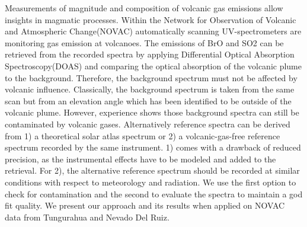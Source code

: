 

Measurements of magnitude and composition of volcanic gas emissions allow insights in magmatic processes. Within the Network for Observation of Volcanic and Atmospheric Change(NOVAC) automatically scanning UV-spectrometers are monitoring gas emission at  volcanoes. The emissions of BrO and SO2 can be retrieved from the recorded spectra by applying Differential Optical Absorption Spectroscopy(DOAS) and comparing the optical absorption of the volcanic plume to the background. Therefore, the background spectrum must not be affected by volcanic influence. Classically, the background spectrum is taken from the same scan but from an elevation angle which has been identified to be outside of the volcanic plume. However, experience shows those background spectra can still be contaminated by volcanic gases.  Alternatively reference spectra can be derived from 1) a theoretical solar atlas spectrum or 2) a volcanic-gas-free reference spectrum recorded by the same instrument. 1) comes with a drawback of reduced precision, as the instrumental effects have to be modeled and added to the retrieval. For 2), the alternative reference spectrum should be recorded at similar conditions with respect to meteorology and radiation. We use the first option to check for contamination and the second to evaluate the spectra to maintain a god fit quality. We present our approach and its results when applied on NOVAC data from Tungurahua and Nevado Del Ruiz.
